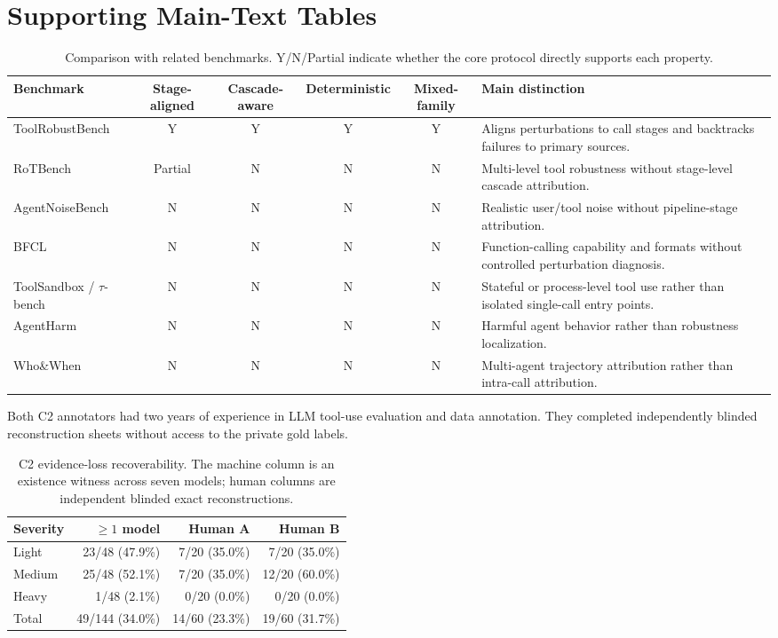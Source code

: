 \documentclass[11pt]{article}
\newcommand{\ToolRobustBench}{ToolRobustBench\xspace}
\begin{document}
\section{Supporting Main-Text Tables}

\begin{table}[htbp]
\centering
\small
\begin{tabularx}{\linewidth}{l c c c c Y}
\toprule
Benchmark & Stage-aligned & Cascade-aware & Deterministic & Mixed-family & Main distinction \\
\midrule
\ToolRobustBench{} & Y & Y & Y & Y & Aligns perturbations to call stages and backtracks failures to primary sources. \\
RoTBench & Partial & N & N & N & Multi-level tool robustness without stage-level cascade attribution. \\
AgentNoiseBench & N & N & N & N & Realistic user/tool noise without pipeline-stage attribution. \\
BFCL & N & N & N & N & Function-calling capability and formats without controlled perturbation diagnosis. \\
ToolSandbox / $\tau$-bench & N & N & N & N & Stateful or process-level tool use rather than isolated single-call entry points. \\
AgentHarm & N & N & N & N & Harmful agent behavior rather than robustness localization. \\
Who\&When & N & N & N & N & Multi-agent trajectory attribution rather than intra-call attribution. \\
\bottomrule
\end{tabularx}
\caption{Comparison with related benchmarks. Y/N/Partial indicate whether the core protocol directly supports each property.}
\label{tab:related-comparison}
\end{table}

Both C2 annotators had two years of experience in LLM tool-use evaluation and data annotation. They completed independently blinded reconstruction sheets without access to the private gold labels.

\begin{table}[htbp]
\centering
\scriptsize
\setlength{\tabcolsep}{3pt}
\begin{tabular}{lrrr}
\toprule
Severity & $\geq 1$ model & Human A & Human B \\
\midrule
Light & 23/48 (47.9\%) & 7/20 (35.0\%) & 7/20 (35.0\%) \\
Medium & 25/48 (52.1\%) & 7/20 (35.0\%) & 12/20 (60.0\%) \\
Heavy & 1/48 (2.1\%) & 0/20 (0.0\%) & 0/20 (0.0\%) \\
\midrule
Total & 49/144 (34.0\%) & 14/60 (23.3\%) & 19/60 (31.7\%) \\
\bottomrule
\end{tabular}
\caption{C2 evidence-loss recoverability. The machine column is an existence witness across seven models; human columns are independent blinded exact reconstructions.}
\label{tab:c2-recoverability}
\end{table}
\end{document}
